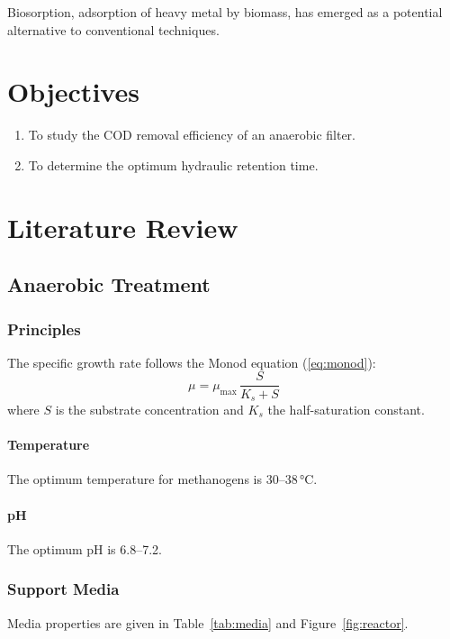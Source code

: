 \documentclass[english]{kuthesis}
\begin{document}
Biosorption, adsorption of heavy metal by biomass, has emerged as a potential alternative
to conventional techniques.

\chapter{Objectives}

\begin{enumerate}
  \item To study the COD removal efficiency of an anaerobic filter.
  \item To determine the optimum hydraulic retention time.
\end{enumerate}

\chapter{Literature Review}

\section{Anaerobic Treatment}

\subsection{Principles}

The specific growth rate follows the Monod equation (\ref{eq:monod}):
\begin{equation}
  \mu = \mu_{\max}\,\frac{S}{K_s + S} \label{eq:monod}
\end{equation}
where $S$ is the substrate concentration and $K_s$ the half-saturation constant.

\subsubsection{Temperature}
The optimum temperature for methanogens is 30--38\,°C.

\subsubsection{pH}
The optimum pH is 6.8--7.2.

\subsection{Support Media}

Media properties are given in Table~\ref{tab:media} and Figure~\ref{fig:reactor}.
\end{document}
